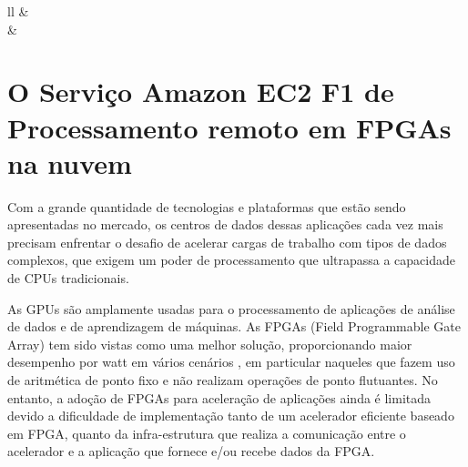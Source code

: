\begin{itemize}
\begin{table}[!htb]
\begin{tabular}{ll}
        &                                                              \\ \hline
     &                                                                                                \\ \hline
    \end{tabular}
   
\end{table}


\end{itemize}

\section{O Serviço Amazon EC2 F1  de Processamento remoto  em   FPGAs na nuvem}\label{sec:servicos amazon}

    Com a grande quantidade de tecnologias e plataformas que estão sendo apresentadas no mercado, os centros de dados dessas aplicações cada vez mais precisam enfrentar o desafio de acelerar cargas de trabalho com tipos de dados complexos, que exigem um poder de processamento que ultrapassa a capacidade de CPUs tradicionais.
    
    As GPUs são amplamente usadas para o processamento de aplicações de análise de dados e de aprendizagem de máquinas. As FPGAs (Field Programmable Gate Array) tem sido vistas como uma melhor solução, proporcionando maior desempenho por watt em vários cenários \cite{8119247}, em particular naqueles que fazem uso de aritmética de ponto fixo e não realizam operações de ponto flutuantes. No entanto, a adoção de FPGAs para aceleração de aplicações ainda é limitada devido a dificuldade de implementação tanto de um acelerador eficiente baseado em FPGA,  quanto da infra-estrutura que realiza a comunicação entre o acelerador e a aplicação que fornece e/ou recebe dados da FPGA. 
    
